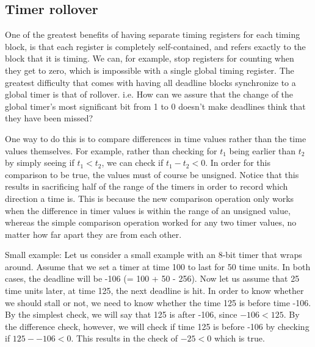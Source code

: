 \documentclass[12pt]{article}
\begin{document}
\subsection{Timer rollover}
One of the greatest benefits of having separate timing registers for each
timing block, is that each register is completely self-contained, and
refers exactly to the block that it is timing.
We can, for example, stop registers for counting when they get to zero,
which is impossible with a single global timing register.
The greatest difficulty that comes with having all deadline blocks synchronize
to a global timer is that of rollover. i.e. How can we assure that the change
of the global timer's most significant bit from 1 to 0 doesn't make deadlines
think that they have been missed?

One way to do this is to compare differences in time values rather than
the time values themselves.
For example, rather than checking for $t_1$ being earlier than $t_2$ by simply seeing if $t_1 < t_2$, we can check if $t_1 - t_2 < 0$.
In order for this comparison to be true, the values must of course be unsigned.
Notice that this results in sacrificing half of the range of the timers
in order to record which direction a time is.
This is because the new comparison operation only works when the difference
in timer values is within the range of an unsigned value,
whereas the simple comparison operation worked for any two timer values,
no matter how far apart they are from each other.

Small example:
Let us consider a small example with an 8-bit timer that wraps around.
Assume that we set a timer at time 100 to last for 50 time units.
In both cases, the deadline will be -106 (= 100 + 50 - 256).
Now let us assume that 25 time units later, at time 125, the next deadline is
hit. In order to know whether we should stall or not,
we need to know whether the time 125 is before time -106.
By the simplest check, we will say that 125 is after -106,
since $-106 < 125$.
By the difference check, however, we will check if time 125 is before -106
by checking if $125 - -106 < 0$.
This results in the check of $-25 < 0$ which is true.
\end{document}

